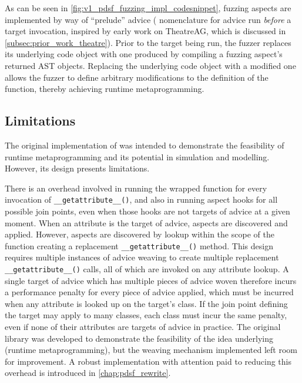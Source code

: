As can be seen in \cref{fig:v1_pdsf_fuzzing_impl_codesnippet}, fuzzing aspects
are implemented by way of ``prelude'' advice (\pdsf{} nomenclature for advice
run \emph{before} a target invocation, inspired by early work on TheatreAG,
which is discussed in \cref{subsec:prior_work_theatre}). Prior to the target
being run, the fuzzer replaces its underlying code object with one produced by
compiling a fuzzing aspect's returned AST objects. Replacing the underlying code
object with a modified one allows the fuzzer to define arbitrary modifications
to the definition of the function, thereby achieving runtime metaprogramming.


\subsection{Limitations}

The original implementation of \pdsf was intended to demonstrate the feasibility
of runtime metaprogramming and its potential in simulation and modelling.
However, its design presents limitations.

There is an overhead involved in running
the wrapped function for every invocation of \lstinline{__getattribute__()}, and
also in running aspect hooks for all possible join points, even when those hooks
are not targets of advice at a given moment.
When an attribute is the target of advice, aspects are discovered and applied.
However, aspects are discovered by lookup within the scope of the function
creating a replacement \lstinline{__getattribute__()} method. This design
requires multiple instances of advice weaving to create multiple replacement
\lstinline{__getattribute__()} calls, all of which are invoked on any attribute
lookup. A single target of advice which has multiple pieces of advice woven
therefore incurs a performance penalty for every piece of advice applied, which
must be incurred when any attribute is looked up on the target's class. If the
join point defining the target may apply to many classes, each class must incur
the same penalty, even if none of their attributes are targets of advice in
practice. The original library was developed to demonstrate the feasibility of
the idea underlying \pdsf{} (runtime metaprogramming), but the weaving mechanism
implemented left room for improvement. A robust implementation with attention
paid to reducing this overhead is introduced in \cref{chap:pdsf_rewrite}.


